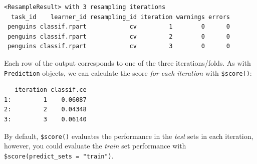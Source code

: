 \begin{Shaded}
\begin{Highlighting}[]
\OtherTok{=} 
\end{Highlighting}
\end{Shaded}

\begin{verbatim}
<ResampleResult> with 3 resampling iterations
  task_id    learner_id resampling_id iteration warnings errors
 penguins classif.rpart            cv         1        0      0
 penguins classif.rpart            cv         2        0      0
 penguins classif.rpart            cv         3        0      0
\end{verbatim}

Each row of the output corresponds to one of the three iterations/folds.
As with \texttt{Prediction} objects, we can calculate the score
\emph{for each iteration} with \texttt{\$score()}:

\begin{Shaded}
\begin{Highlighting}[]
\OtherTok{=}\SpecialCharTok{$}\NormalTok{(}\NormalTok{(}\NormalTok{))}
\end{Highlighting}
\end{Shaded}

\begin{verbatim}
   iteration classif.ce
1:         1    0.06087
2:         2    0.04348
3:         3    0.06140
\end{verbatim}

\begin{tcolorbox}[enhanced jigsaw, opacitybacktitle=0.6, rightrule=.15mm, opacityback=0, arc=.35mm, breakable, titlerule=0mm, colframe=quarto-callout-tip-color-frame, coltitle=black, bottomrule=.15mm, toprule=.15mm, colback=white, colbacktitle=quarto-callout-tip-color!10!white, bottomtitle=1mm, toptitle=1mm, title=\textcolor{quarto-callout-tip-color}{\faLightbulb}\hspace{0.5em}{Evaluating Train Sets}, leftrule=.75mm, left=2mm]

By default, \texttt{\$score()} evaluates the performance in the
\emph{test} sets in each iteration, however, you could evaluate the
\emph{train} set performance with
\texttt{\$score(predict\_sets\ =\ "train")}.

\end{tcolorbox}

